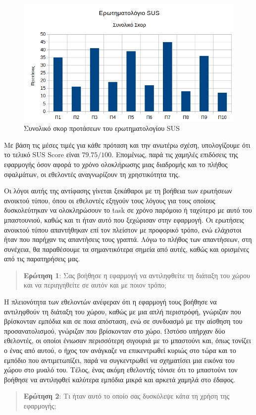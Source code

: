\begin{figure}[!ht]
    \centering
    \includegraphics[width=1\textwidth]{./images/questionnaireSUSTotalScore.png}
    \caption{Συνολικό σκορ προτάσεων του ερωτηματολογίου SUS}\label{fig:questionnaireSUSTotalScore}
\end{figure}

Με βάση τις μέσες τιμές για κάθε πρόταση και την ανωτέρω σχέση, υπολογίζουμε ότι το τελικό SUS Score είναι $79.75 / 100$. Επομένως, παρά τις χαμηλές επιδόσεις της εφαρμογής όσον αφορά το χρόνο ολοκλήρωσης μιας διαδρομής και το πλήθος σφαλμάτων, οι εθελοντές αναγνωρίζουν τη χρηστικότητα της.

Οι λόγοι αυτής της αντίφασης γίνεται ξεκάθαροι με τη βοήθεια των ερωτήσεων ανοικτού τύπου, όπου οι εθελοντές εξηγούν τους λόγους για τους οποίους δυσκολεύτηκαν να ολοκληρώσουν το task σε χρόνο παρόμοιο ή ταχύτερο με αυτό του μπαστουνιού, καθώς και τι ήταν αυτό που ξεχώρισαν στην εφαρμογή. Οι ερωτήσεις ανοικτού τύπου απαντήθηκαν επί τον πλείστον με προφορικό τρόπο, ενώ ελάχιστοι ήταν που παρήχαν τις απαντήσεις τους γραπτά. Λόγω το πλήθος των απαντήσεων, στη συνέχεια, θα παραθέσουμε τα σημαντικότερα σημεία από αυτές, καθώς και ορισμένες από τις παρατηρήσεις μας.
\\[\baselineskip]
\begin{quote}
    \textbf{Ερώτηση 1}: Σας βοήθησε η εφαρμογή να αντιληφθείτε τη διάταξη του χώρου και να περιηγηθείτε σε αυτόν και με ποιον τρόπο;
\end{quote}

Η πλειονότητα των εθελοντών ανέφεραν ότι η εφαρμογή τους βοήθησε να αντιληφθούν τη διάταξη του χώρου, καθώς με μια απλή περιστρόφή, γνώριζαν που βρίσκονταν εμπόδια και σε ποια απόσταση, ενώ σε συνδυασμό με την αίσθηση του προσανατολισμού, γνώριζαν που βρίσκονταν στο χώρο. Ωστόσο υπήρχαν δύο εθελοντές, οι οποίοι ένιωσαν περισσότερη σιγουριά με το μπαστούνι και, όπως τονίζει ο ένας από αυτού, ο ήχος τον ανάγκαζε να επικεντρωθεί κυριώς στο τώρα και το εμπόδιο που αντιμετωπίζει, παρά να συγκεντρωθεί να σχηματίσει μια εικόνα του χώρου στο μυαλό του. Τέλος, ένας ακόμη εθελοντής τόνισε ότι το μπαστούνι τον βοήθησε να αντιληφθεί καλύτερα εμπόδια μικρά και αρκετά χαμηλά στο έδαφος.
\\[\baselineskip]
\begin{quote}
    \textbf{Ερώτηση 2}: Τι ήταν αυτό το οποίο σας δυσκόλεψε κάτα τη χρήση της εφαρμογής;
\end{quote}

